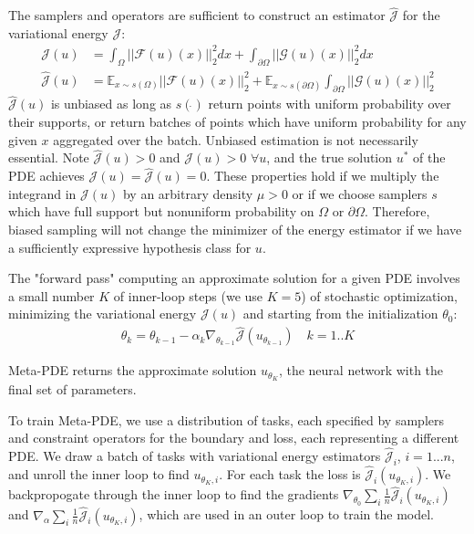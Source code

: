 The samplers and operators are sufficient to construct an estimator $\hat{\mathcal{J}}$ for the variational
energy $\mathcal{J}$:
\begin{align*}
  \mathcal{J}(u) &= \int_{\Omega} ||\mathcal{F}(u)(x)||^2_2 dx +
  \int_{\partial\Omega} ||\mathcal{G}(u)(x)||_2^2 dx \\
  \hat{\mathcal{J}}(u) &= \mathbb{E}_{x \sim s(\Omega)} ||\mathcal{F}(u)(x)||^2_2 +
  \mathbb{E}_{x \sim s(\partial \Omega)} \int_{\partial \Omega} ||\mathcal{G}(u)(x)||_2^2
\end{align*}
$\hat{\mathcal{J}}(u)$ is unbiased as long as $s(\dot{})$ return points with
uniform probability over their supports, or return batches of points which have uniform
probability for any given $x$ aggregated over the batch. Unbiased estimation is not
necessarily essential. Note $\hat{\mathcal{J}}(u) > 0$ and $\mathcal{J}(u) > 0$
$\forall u$, and the true solution $u^*$ of the PDE achieves
$\mathcal{J}(u) = \hat{\mathcal{J}}(u) = 0$. These properties hold if we multiply
the integrand in $\mathcal{J}(u)$ by an arbitrary density $\mu > 0$ or if we
choose samplers $s$ which have full support but nonuniform probability on $\Omega$
or $\partial \Omega$. Therefore, biased sampling will not change the minimizer of the
energy estimator if we have a sufficiently expressive hypothesis class for $u$.

The "forward pass" computing an approximate solution for a given PDE involves
a small number $K$ of inner-loop steps (we use $K=5$) of stochastic optimization,
minimizing the variational energy $\mathcal{J}(u)$ and starting from
the initialization $\theta_0$:
\begin{align*}
  \theta_k = \theta_{k-1} - \alpha_k \nabla_{\theta_{k-1}} \hat{\mathcal{J}}(u_{\theta_{k-1}}) \quad k = 1 .. K
\end{align*}

Meta-PDE returns the approximate solution $u_{\theta_K}$, the neural network
with the final set of parameters.

To train Meta-PDE, we use a distribution of tasks, each specified by
samplers and constraint operators for the boundary and loss, each representing a
different PDE.
We draw a batch of tasks with variational energy estimators $\hat{\mathcal{J}}_i$,
$i = 1 ... n$, and unroll the inner loop to find $u_{\theta_K, i}$.
For each task the loss is $\hat{\mathcal{J}}_i(u_{\theta_K, i})$.
We backpropogate through the inner loop to find the gradients
$\nabla_{\theta_0} \sum_i \frac{1}{n} \hat{\mathcal{J}}_i(u_{\theta_K, i})$
and $\nabla_{\alpha} \sum_i \frac{1}{n} \hat{\mathcal{J}}_i(u_{\theta_K, i})$,
which are used in an outer loop to train the model.

